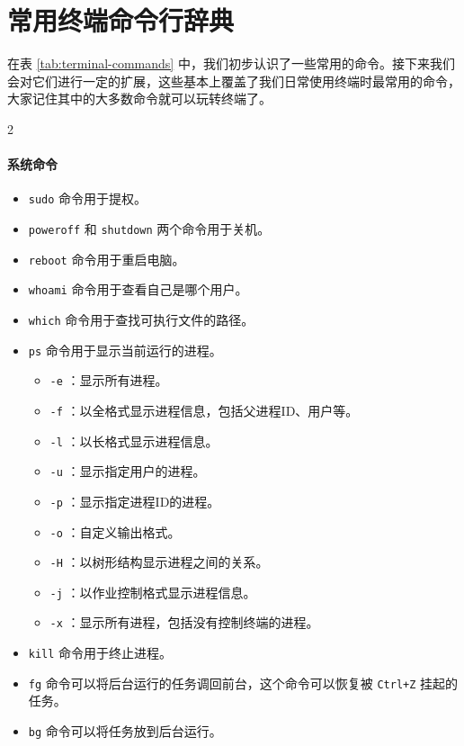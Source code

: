\section{常用终端命令行辞典}\label{sec:shell}

在表 \ref{tab:terminal-commands} 中，我们初步认识了一些常用的命令。接下来我们会对它们进行一定的扩展，这些基本上覆盖了我们日常使用终端时最常用的命令，大家记住其中的大多数命令就可以玩转终端了。

\begin{multicols}{2}

    \paragraph{系统命令}
    \begin{itemize}
        \item  \texttt{sudo} 命令用于提权。
        \item  \texttt{poweroff} 和 \texttt{shutdown} 两个命令用于关机。
        \item  \texttt{reboot} 命令用于重启电脑。
        \item  \texttt{whoami} 命令用于查看自己是哪个用户。
        \item  \texttt{which} 命令用于查找可执行文件的路径。
        \item  \texttt{ps} 命令用于显示当前运行的进程。
            \begin{itemize}
                \item  \texttt{-e} ：显示所有进程。
                \item  \texttt{-f} ：以全格式显示进程信息，包括父进程ID、用户等。
                \item  \texttt{-l} ：以长格式显示进程信息。
                \item  \texttt{-u} ：显示指定用户的进程。
                \item  \texttt{-p} ：显示指定进程ID的进程。
                \item  \texttt{-o} ：自定义输出格式。
                \item  \texttt{-H} ：以树形结构显示进程之间的关系。
                \item  \texttt{-j} ：以作业控制格式显示进程信息。
                \item  \texttt{-x} ：显示所有进程，包括没有控制终端的进程。
            \end{itemize}
        \item  \texttt{kill} 命令用于终止进程。
        \item  \texttt{fg} 命令可以将后台运行的任务调回前台，这个命令可以恢复被 \texttt{Ctrl+Z} 挂起的任务。
        \item  \texttt{bg} 命令可以将任务放到后台运行。
    \end{itemize}

\end{multicols}
